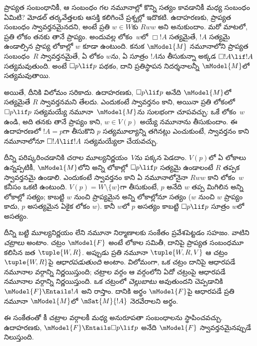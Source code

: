\documentclass[../../../include/open-logic-section]{subfiles}
\begin{document}


ప్రాప్యత సంబంధానికీ, ఆ సంబంధం గల నమూనాల్లో కొన్ని 
సత్యం కావడానికీ మధ్య సంబంధం ఏమిటి? మోడల్ తర్కవేత్తలకు
ఆసక్తి కలిగించే ప్రశ్నల్లో ఇదొకటి. ఉదాహరణకు, ప్రాప్యత సంబంధం స్వావర్తనమైనదని,
అంటే ప్రతి $w \in W$కు $Rww$ అని అనుకుందాం.
మరో మాటలో, ప్రతి లోకం తనకు తానే ప్రాప్యం.
అందువల్ల లోకం~$w$లో $\Box !A$ సత్యమైతే,
$!A$ సత్యమై ఉండాల్సిన ప్రాప్య లోకాల్లో $w$ కూడా ఉంటుంది. కనుక $\mModel{M}$ నమూనాలోని
ప్రాప్యత సంబంధం~$R$ స్వావర్తనమైతే, ఏ లోకం $w$ను,
ఏ సూత్రం $!A$ను తీసుకున్నా అక్కడ $\Box !A
\lif !A$ సత్యమవుతుంది. అంటే $\Box p \lif
p$ పథకం, దాని ప్రతిస్థాపన నిదర్శనాలన్నీ
$\mModel{M}$లో సత్యమవుతాయి.

అయితే, దీనికి విలోమం సరికాదు. ఉదాహరణకు,
$\Box p \lif p$ అనేది $\mModel{M}$లో సత్యమైతే
$R$ స్వావర్తనమని తేలదు. ఎందుకంటే స్వావర్తనం కాని,
అయినా ప్రతి లోకంలో $\Box p \lif p$ సత్యమయ్యే
నమూనా~$\mModel{M}$ను సులభంగా చూపవచ్చు:
ఒకే లోకం~$w$ ఉండి, అది తనకు తానే ప్రాప్యం కాని,
$w \in V(p)$ అయ్యే నమూనాను తీసుకుందాం.
ఈ ఉదాహరణలో $!A=p$గా తీసుకొని $p$ సత్యమూల్యాన్ని
తగినట్లు ఎంచుకుంటే, స్వావర్తనం కాని నమూనాలోనూ
$\Box !A \lif !A$ సత్యమయ్యేలా చేయవచ్చు.

దీన్ని పరిష్కరించడానికి చరాల మూల్యనిర్ణయం~$V$ను
పక్కన పెడదాం. $V(p)$లో ఏ లోకాలు ఉన్నప్పటికీ,
$\mModel{M}$లోని అన్ని లోకాల్లో $\Box p \lif p$
సత్యమై ఉండాలంటే $R$ తప్పక స్వావర్తనమై ఉండాలి.
ఎందుకంటే స్వావర్తనం కాని ఏ నమూనాలోనైనా
$Rww$ కాని లోకం~$w$ కనీసం ఒకటి ఉంటుంది.
$V(p) = W \setminus \{w\}$గా తీసుకుంటే,
$p$ అనేది $w$ తప్ప మిగిలిన అన్ని లోకాల్లో సత్యం;
కాబట్టి $w$ నుంచి ప్రాప్యమైన అన్ని లోకాల్లోనూ
సత్యం ($w$ నుంచి $w$ ప్రాప్యం కాదు, $p$ అసత్యమైన ఏకైక
లోకం $w$).
కానీ $w$లో $p$ అసత్యం కాబట్టి
$\Box p \lif p$ సూత్రం $w$లో అసత్యం.

దీన్ని బట్టి మూల్యనిర్ణయం లేని నమూనా నిర్మాణాలకు సంకేతం
ప్రవేశపెట్టడం సహజం. వాటిని \emph{చట్రాలు} అంటాం.
చట్రం $\mModel{F}$ అంటే లోకాల సమితీ, దానిపై ప్రాప్యత
సంబంధమూ కలిసిన జత $\tuple{W, R}$. అప్పుడు ప్రతి నమూనా
$\tuple{W, R, V}$ ఆ చట్రం $\tuple{W, R}$పై
\emph{ఆధారపడుతుంది} అంటాం. విలోమంగా,
ఒక చట్రం దానిపై ఆధారపడే నమూనాల వర్గాన్ని
నిర్ణయిస్తుంది; చట్రాల వర్గం ఆ వర్గంలోని ఏదో
చట్రంపై ఆధారపడే నమూనాల వర్గాన్ని నిర్ణయిస్తుంది.
ఒక చట్రంలో  \emph{చెల్లుబాటు}
అవుతుందని చెప్పడానికి $\mModel{F} \Entails !A$ అని రాస్తాం.
దానికి అర్థం $\mModel{F}$పై ఆధారపడే ప్రతి నమూనా $\mModel{M}$లో
$\mSat{M}{!A}$ నెరవేరాలని అర్థం.

ఈ సంకేతంతో కీ
చట్రాల వర్గాలకీ మధ్య అనురూపతా సంబంధాలను
స్థాపించవచ్చు. ఉదాహరణకు, $\mModel{F} \Entails \Box p \lif p$
అనేది $\mModel{F}$ స్వావర్తనమైనప్పుడే నిలుస్తుంది.
\end{document}
